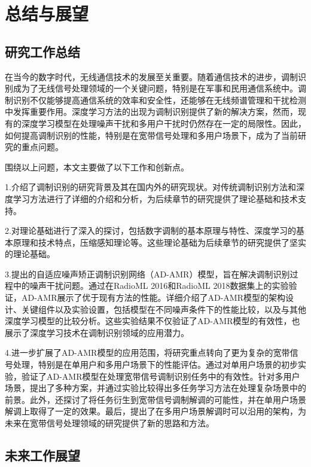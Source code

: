 \chapter{总结与展望}\label{chap:intro}
\section{研究工作总结}\label{sec:background}

在当今的数字时代，无线通信技术的发展至关重要。随着通信技术的进步，调制识别成为了无线信号处理领域的一个关键问题，特别是在军事和民用通信系统中。调制识别不仅能够提高通信系统的效率和安全性，还能够在无线频谱管理和干扰检测中发挥重要作用。深度学习方法的出现为调制识别提供了新的解决方案，然而，现有的深度学习模型在处理噪声干扰和多用户干扰时仍然存在一定的局限性。因此，如何提高调制识别的性能，特别是在宽带信号处理和多用户场景下，成为了当前研究的重点问题。

围绕以上问题，本文主要做了以下工作和创新点。

1.介绍了调制识别的研究背景及其在国内外的研究现状。对传统调制识别方法和深度学习方法进行了详细的介绍和分析，为后续章节的研究提供了理论基础和技术支持。

2.对理论基础进行了深入的探讨，包括数字调制的基本原理与特性、深度学习的基本原理和技术特点，压缩感知理论等。这些理论基础为后续章节的研究提供了坚实的理论基础。

3.提出的自适应噪声矫正调制识别网络（AD-AMR）模型，旨在解决调制识别过程中的噪声干扰问题。通过在RadioML 2016和RadioML 2018数据集上的实验验证，AD-AMR展示了优于现有方法的性能。详细介绍了AD-AMR模型的架构设计、关键组件以及实验设置，包括模型在不同噪声条件下的性能比较，以及与其他深度学习模型的比较分析。这些实验结果不仅验证了AD-AMR模型的有效性，也展示了深度学习技术在调制识别领域的应用潜力。

4.进一步扩展了AD-AMR模型的应用范围，将研究重点转向了更为复杂的宽带信号处理，特别是在单用户和多用户场景下的性能评估。通过对单用户场景的初步实验，验证了AD-AMR模型在处理宽带信号调制识别任务中的有效性。针对多用户场景，提出了多种方案，并通过实验比较得出多任务学习方法在处理复杂场景中的前景。此外，还探讨了将任务衍生到宽带信号调制解调的可能性，并在单用户场景解调上取得了一定的效果。最后，提出了在多用户场景解调时可以沿用的架构，为未来在宽带信号处理领域的研究提供了新的思路和方法。


\section{未来工作展望}\label{sec:background}

